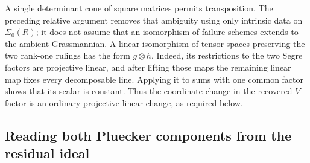 \begin{remark}
A single determinant cone of square matrices permits transposition.
The preceding relative argument removes that ambiguity using only
intrinsic data on \(\Sigma_0(R)\); it does not assume that an
isomorphism of failure schemes extends to the ambient Grassmannian.
A linear isomorphism of tensor spaces preserving the two rank-one
rulings has the form \(g\otimes h\).  Indeed, its restrictions
to the two Segre factors are projective linear, and after lifting
those maps the remaining linear map fixes every decomposable line.
Applying it to sums with one common factor shows that its scalar is
constant.  Thus the coordinate change in the recovered \(V\)
factor is an ordinary projective linear change, as required below.
\end{remark}

\subsection{Reading both Pluecker components from the residual ideal}

